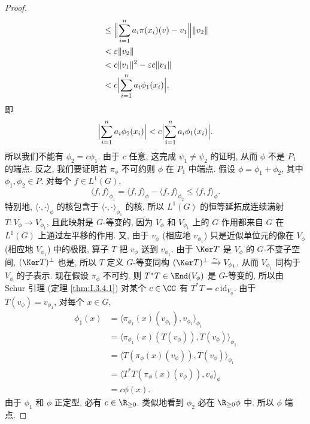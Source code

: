 \begin{proof}
\begin{align*}
&\leq \Bigl\|\sum_{i=1}^n a_i\pi(x_i)(v) - v_1\Bigr\|\|v_2\| \\
&< \varepsilon\|v_2\| \\
&< c\|v_1\|^2 - \varepsilon c\|v_1\| \\
&< c\Bigl|\sum_{i=1}^n a_i\phi_1(x_i)\Bigr|,
\end{align*}
即
\[
\Bigl|\sum_{i=1}^n a_i\phi_2(x_i)\Bigr| < c\Bigl|\sum_{i=1}^n a_i\phi_1(x_i)\Bigr|.
\]
所以我们不能有 $\phi_2 = c\phi_1$. 由于 $c$ 任意, 这完成 $\psi_1 \neq \psi_2$ 的证明, 从而 $\phi$ 不是 $P_1$ 的端点.
反之, 我们要证明若 $\pi_{\phi}$ 不可约则 $\phi$ 在 $P_1$ 中端点. 假设 $\phi = \phi_1 + \phi_2$, 其中 $\phi_1, \phi_2 \in P$. 对每个 $f \in L^1(G)$,
\[
\langle f, f \rangle_{\phi_1} = \langle f, f \rangle_{\phi} - \langle f, f \rangle_{\phi_2} \leq \langle f, f \rangle_{\phi}.
\]
特别地, $\langle \cdot, \cdot \rangle_{\phi}$ 的核包含于 $\langle \cdot, \cdot \rangle_{\phi_1}$ 的核, 所以 $L^1(G)$ 的恒等延拓成连续满射 $T \colon V_{\phi} \to V_{\phi_1}$, 且此映射是 $G$-等变的, 因为 $V_{\phi}$ 和 $V_{\phi_1}$ 上的 $G$ 作用都来自 $G$ 在 $L^1(G)$ 上通过左平移的作用. 又, 由于 $v_{\phi}$ (相应地 $v_{\phi_1}$) 只是近似单位元的像在 $V_{\phi}$ (相应地 $V_{\phi_1}$) 中的极限, 算子 $T$ 把 $v_{\phi}$ 送到 $v_{\phi_1}$. 由于 $\Ker T$ 是 $V_{\phi}$ 的 $G$-不变子空间, $(\Ker T)^{\perp}$ 也是, 所以 $T$ 定义 $G$-等变同构 $(\Ker T)^{\perp} \xrightarrow{\sim} V_{\phi_1}$, 从而 $V_{\phi_1}$ 同构于 $V_{\phi}$ 的子表示.
现在假设 $\pi_{\phi}$ 不可约. 则 $T^*T \in \End(V_{\phi})$ 是 $G$-等变的, 所以由 Schur 引理 (定理 \ref{thm:I.3.4.1}) 对某个 $c \in \CC$ 有 $T^*T = c\,\mathrm{id}_{V_{\phi}}$. 由于 $T(v_{\phi}) = v_{\phi_1}$, 对每个 $x \in G$,
\begin{align*}
\phi_1(x) &= \langle \pi_{\phi_1}(x)(v_{\phi_1}), v_{\phi_1} \rangle_{\phi_1} \\
&= \langle \pi_{\phi_1}(x)(T(v_{\phi})), T(v_{\phi}) \rangle_{\phi_1} \\
&= \langle T(\pi_{\phi}(x)(v_{\phi})), T(v_{\phi}) \rangle_{\phi_1} \\
&= \langle T^*T(\pi_{\phi}(x)(v_{\phi})), v_{\phi} \rangle_{\phi} \\
&= c\phi(x).
\end{align*}
由于 $\phi_1$ 和 $\phi$ 正定型, 必有 $c \in \R_{\geq 0}$. 类似地看到 $\phi_2$ 必在 $\R_{\geq 0}\phi$ 中. 所以 $\phi$ 端点.
\end{proof}

